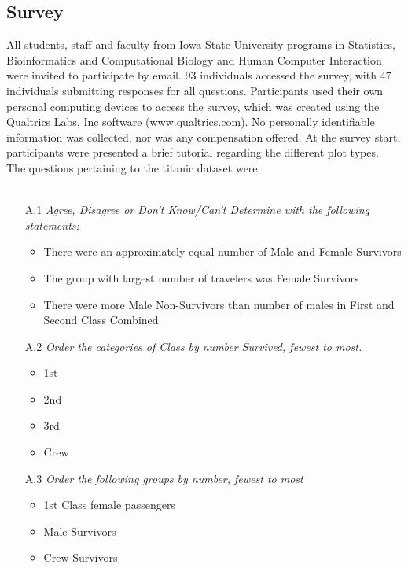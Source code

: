 \subsection*{Survey }\label{app2}
All students, staff and faculty from Iowa State University programs in Statistics, Bioinformatics and Computational Biology and Human Computer Interaction were invited to participate by email. 93 individuals accessed the survey, with 47 individuals submitting responses for all questions. Participants used their own personal computing devices to access the survey, which was created using the  Qualtrics Labs, Inc software (\url{www.qualtrics.com}). No personally identifiable information was collected, nor was any compensation offered. At the survey start, participants were presented a brief tutorial regarding the different plot types.  \\

\noindent The questions pertaining to the titanic dataset were: \\ \\
\begin{itemize}
\item[A.1]\emph{Agree, Disagree or Don't Know/Can't Determine with the following statements:}
\begin{itemize}
\item There were an approximately equal number of Male and Female Survivors
\item The group with largest number of travelers was Female Survivors
\item There were more Male Non-Survivors than number of males in First and Second Class Combined
\end{itemize}

\item[A.2]\emph{Order the categories of Class by number Survived, fewest to most.} 
\begin{itemize}
\item 1st
\item 2nd 
\item 3rd
\item Crew
\end{itemize}

\item[A.3]\emph{Order the following groups by number, fewest to most}
\begin{itemize}
\item 1st Class female passengers
\item Male Survivors
\item Crew Survivors
\end{itemize}
\end{itemize}



